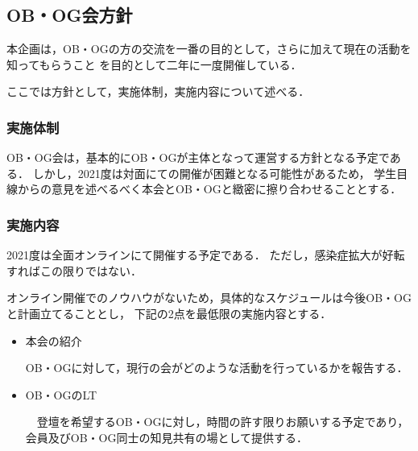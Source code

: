 \subsection*{OB・OG会方針}


本企画は，OB・OGの方の交流を一番の目的として，さらに加えて現在の活動を知ってもらうこと
を目的として二年に一度開催している．

ここでは方針として，実施体制，実施内容について述べる．

\subsubsection*{実施体制}

OB・OG会は，基本的にOB・OGが主体となって運営する方針となる予定である．
しかし，2021度は対面にての開催が困難となる可能性があるため，
学生目線からの意見を述べるべく本会とOB・OGと緻密に擦り合わせることとする．

\subsubsection*{実施内容}

2021度は全面オンラインにて開催する予定である．
ただし，感染症拡大が好転すればこの限りではない．

オンライン開催でのノウハウがないため，具体的なスケジュールは今後OB・OGと計画立てることとし，
下記の2点を最低限の実施内容とする．

\begin{itemize}
    \item 本会の紹介

        OB・OGに対して，現行の会がどのような活動を行っているかを報告する．
    \item OB・OGのLT

        　登壇を希望するOB・OGに対し，時間の許す限りお願いする予定であり，会員及びOB・OG同士の知見共有の場として提供する．
\end{itemize}

